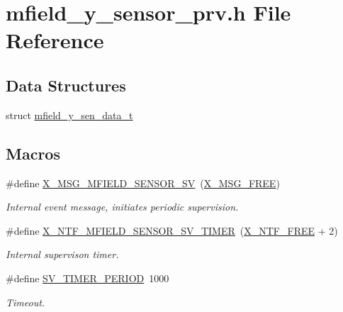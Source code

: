 \hypertarget{a00026}{\section{mfield\+\_\+y\+\_\+sensor\+\_\+prv.\+h File Reference}
\label{a00026}
}
\subsection*{Data Structures}
\begin{DoxyCompactItemize}
\item 
struct \hyperlink{a00026_dc/d25/a00596}{mfield\+\_\+y\+\_\+sen\+\_\+data\+\_\+t}
\end{DoxyCompactItemize}
\subsection*{Macros}
\begin{DoxyCompactItemize}
\item 
\#define \hyperlink{a00026_a510020575747f82c587c5485b8619f78}{X\+\_\+\+M\+S\+G\+\_\+\+M\+F\+I\+E\+L\+D\+\_\+\+S\+E\+N\+S\+O\+R\+\_\+\+S\+V}~(\hyperlink{a00036_a082eb6e82ded25b00f04da4f611c961e}{X\+\_\+\+M\+S\+G\+\_\+\+F\+R\+E\+E})
\begin{DoxyCompactList}\small\item\em Internal event message, initiates periodic supervision. \end{DoxyCompactList}\item 
\#define \hyperlink{a00026_ad9eede821e7c65d58f1806af4bd6bf29}{X\+\_\+\+N\+T\+F\+\_\+\+M\+F\+I\+E\+L\+D\+\_\+\+S\+E\+N\+S\+O\+R\+\_\+\+S\+V\+\_\+\+T\+I\+M\+E\+R}~(\hyperlink{a00036_ab2eeea4643823a0c7c7731ddb83e3edc}{X\+\_\+\+N\+T\+F\+\_\+\+F\+R\+E\+E} + 2)
\begin{DoxyCompactList}\small\item\em Internal supervison timer. \end{DoxyCompactList}\item 
\#define \hyperlink{a00026_a8a535456285f4602701c814d7b69cc68}{S\+V\+\_\+\+T\+I\+M\+E\+R\+\_\+\+P\+E\+R\+I\+O\+D}~1000
\begin{DoxyCompactList}\small\item\em Timeout. \end{DoxyCompactList}\end{DoxyCompactItemize}
